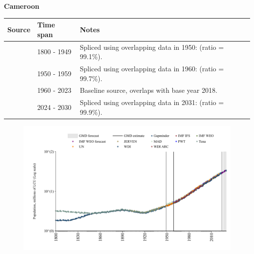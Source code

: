 \documentclass[12pt,a4paper,landscape]{article}
\begin{document}
\begin{adjustbox}{max totalsize={\paperwidth}{\paperheight},center}
\begin{minipage}[t][\textheight][t]{\textwidth}
\vspace*{0.5cm}
{}
\begin{center}
{\Large\bfseries Cameroon}
\end{center}
\vspace{0.5cm}
\begin{table}[H]
\centering
\small
\begin{tabular}{|l|l|l|}
\hline
\textbf{Source} & \textbf{Time span} & \textbf{Notes} \\
\hline
\rowcolor{white}\cite{Gapminder}& 1800 - 1949 &Spliced using overlapping data in 1950: (ratio = 99.1\%).\\
\rowcolor{lightgray}\cite{IMF_IFS}& 1950 - 1959 &Spliced using overlapping data in 1960: (ratio = 99.7\%).\\
\rowcolor{white}\cite{WDI}& 1960 - 2023 &Baseline source, overlaps with base year 2018.\\
\rowcolor{lightgray}\cite{Gapminder}& 2024 - 2030 &Spliced using overlapping data in 2031: (ratio = 99.9\%).\\
\hline
\end{tabular}
\end{table}
\begin{figure}[H]
\centering
\includegraphics[width=\textwidth,height=0.6\textheight,keepaspectratio]{graphs/CMR_pop.pdf}
\end{figure}
\end{minipage}
\end{adjustbox}
\end{document}
